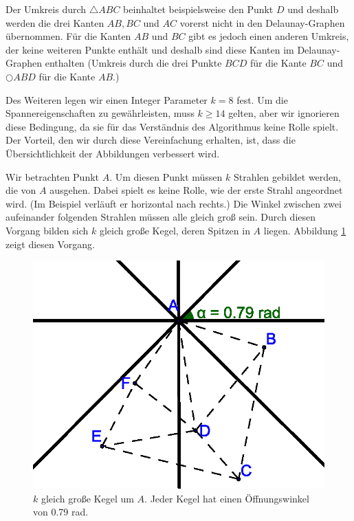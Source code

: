 \documentclass[a4paper,twoside]{IEEEtran}
\begin{document}
Der Umkreis durch $\triangle{ABC} $ beinhaltet beispielsweise den Punkt $D $ und deshalb werden die drei Kanten $AB, BC $ und $AC $ vorerst nicht in den Delaunay-Graphen übernommen.
Für die Kanten $AB $ und $BC $ gibt es jedoch einen anderen Umkreis, der keine weiteren Punkte enthält und deshalb sind diese Kanten im Delaunay-Graphen enthalten (Umkreis durch die drei Punkte $BCD $ für die Kante $BC $ und  $\bigcirc{ABD} $ für die Kante $AB $.)

Des Weiteren legen wir einen Integer Parameter $k=8 $ fest.
Um die Spannereigenschaften zu gewährleisten, muss $k \geq 14 $ gelten, aber wir ignorieren diese Bedingung, da sie für das Verständnis des Algorithmus keine Rolle spielt.
Der Vorteil, den wir durch diese Vereinfachung erhalten, ist, dass die Übersichtlichkeit der Abbildungen verbessert wird.

Wir betrachten Punkt $A $.
Um diesen Punkt müssen $k $ Strahlen gebildet werden, die von $A $ ausgehen.
Dabei spielt es keine Rolle, wie der erste Strahl angeordnet wird. (Im Beispiel verläuft er horizontal nach rechts.)
Die Winkel zwischen zwei aufeinander folgenden Strahlen müssen alle gleich groß sein.
Durch diesen Vorgang bilden sich $k $ gleich große Kegel, deren Spitzen in $A $ liegen.
Abbildung \ref{fig:cones} zeigt diesen Vorgang.

\begin{figure}[h!]
\centering
\includegraphics[width=1\linewidth]{cones.eps}
\caption{$k $ gleich große Kegel um $A $. Jeder Kegel hat einen Öffnungswinkel von 0.79 rad.}
\label{fig:cones}
\end{figure}
\end{document}
